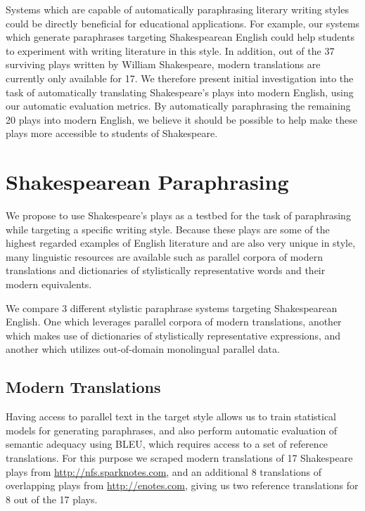 \documentclass[10pt,a5paper,twoside]{article}
\begin{document}
Systems which are capable of automatically paraphrasing literary writing styles could be directly beneficial for educational applications.  For example, our systems which generate paraphrases targeting
Shakespearean English could help students to experiment with writing literature in this style.
In addition, out of the 37 surviving plays written by William Shakespeare, modern translations are currently only available for 17.  
We therefore present initial investigation into the task of automatically translating Shakespeare's plays into modern English, using our automatic evaluation metrics.
By automatically paraphrasing the remaining 20 plays into modern English, 
we believe it should be possible to help make these plays more accessible to students of Shakespeare.

\section{Shakespearean Paraphrasing}
We propose to use Shakespeare's plays as a testbed for the task of paraphrasing while targeting a specific writing style.  Because these plays are some of the
highest regarded examples of English literature and are also very unique in style, many linguistic resources are available such as parallel corpora
of modern translations and dictionaries of stylistically representative words and their modern equivalents.

We compare 3 different stylistic paraphrase systems targeting Shakespearean English.  One which leverages parallel corpora of modern translations, another which makes use
of dictionaries of stylistically representative expressions, and another which utilizes out-of-domain monolingual parallel data.

\subsection{Modern Translations}
Having access to parallel text in the target style allows us to train statistical models for generating paraphrases, and also perform automatic evaluation of semantic adequacy using BLEU, which requires access to a set of reference translations.  For this purpose we scraped modern translations of 17 Shakespeare plays from \url{http://nfs.sparknotes.com}, and an additional 8 translations of overlapping plays from \url{http://enotes.com}, giving us two reference translations for 8 out of the 17 plays.
\end{document}
